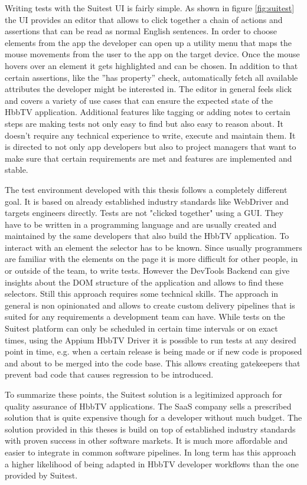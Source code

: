 Writing tests with the Suitest UI is fairly simple. As shown in figure \ref{fig:suitest} the UI provides an editor that allows to click together a chain of actions and assertions that can be read as normal English sentences. In order to choose elements from the app the developer can open up a utility menu that maps the mouse movements from the user to the app on the target device. Once the mouse hovers over an element it gets highlighted and can be chosen. In addition to that certain assertions, like the ''has property'' check, automatically fetch all available attributes the developer might be interested in. The editor in general feels slick and covers a variety of use cases that can ensure the expected state of the HbbTV application. Additional features like tagging or adding notes to certain steps are making tests not only easy to find but also easy to reason about. It doesn't require any technical experience to write, execute and maintain them. It is directed to not only app developers but also to project managers that want to make sure that certain requirements are met and features are implemented and stable.

The test environment developed with this thesis follows a completely different goal. It is based on already established industry standards like WebDriver and targets engineers directly. Tests are not "clicked together" using a GUI. They have to be written in a programming language and are usually created and maintained by the same developers that also build the HbbTV application. To interact with an element the selector has to be known. Since usually programmers are familiar with the elements on the page it is more difficult for other people, in or outside of the team, to write tests. However the DevTools Backend can give insights about the DOM structure of the application and allows to find these selectors. Still this approach requires some technical skills. The approach in general is non opinionated and allows to create custom delivery pipelines that is suited for any requirements a development team can have. While tests on the Suitest platform can only be scheduled in certain time intervals or on exact times, using the Appium HbbTV Driver it is possible to run tests at any desired point in time, e.g. when a certain release is being made or if new code is proposed and about to be merged into the code base. This allows creating gatekeepers that prevent bad code that causes regression to be introduced.

To summarize these points, the Suitest solution is a legitimized approach for quality assurance of HbbTV applications. The SaaS company sells a prescribed solution that is quite expensive though for a developer without much budget. The solution provided in this theses is build on top of established industry standards with proven success in other software markets. It is much more affordable and easier to integrate in common software pipelines. In long term has this approach a higher likelihood of being adapted in HbbTV developer workflows than the one provided by Suitest.
